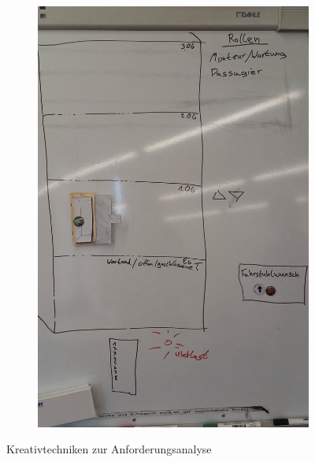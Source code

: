 \begin{figure}
\begin{subfigure}[c]{0.5\textwidth}
\label{fig:Whiteboard}
\includegraphics[width=\textwidth]{images/kundengespraech1.jpg}

\end{subfigure}
\begin{subfigure}[c]{0.5\textwidth}
\label{fig:Pappfahrstuhl}
\missingfigure[figwidth=\textwidth]{}
\end{subfigure}
\caption{Kreativtechniken zur Anforderungsanalyse}
\end{figure}

